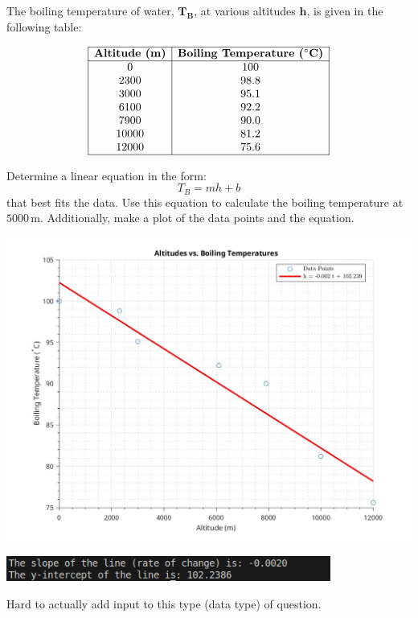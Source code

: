 \documentclass[a4paper, 12pt]{report}
\def\ni{green!60!black!40!white}
\def\link{blue!50!black}
\begin{document}
\begin{tcolorbox}[title={\color{black}\section{Q1}}, colback=white, colframe=\ni, boxrule=1mm, width=1\textwidth]
    The boiling temperature of water, \(\mathbf{T_B}\), at various altitudes \(\mathbf{h}\), is given in the following table:
    
    \[
    \begin{array}{|c|c|}
        \hline
        \textbf{Altitude (m)} & \textbf{Boiling Temperature (\(^\circ\text{C}\))} \\ \hline
        0 & 100 \\ 
        2300 & 98.8 \\ 
        3000 & 95.1 \\ 
        6100 & 92.2 \\ 
        7900 & 90.0 \\ 
        10000 & 81.2 \\ 
        12000 & 75.6 \\ \hline
    \end{array}
    \]
    
    Determine a linear equation in the form:
    \[
    T_B = mh + b
    \]
    that best fits the data. Use this equation to calculate the boiling temperature at \(5000 \, \text{m}\). Additionally, make a plot of the data points and the equation.
\end{tcolorbox}


\includegraphics[width=1\textwidth]{main/graphs_images/altitudes_vs_boiling_temperatures.jpeg}
\begin{center}
    \includegraphics[width=0.8\textwidth]{main/graphs_images/1screen.png}
\end{center}
Hard to actually add input to this type (data type) of question.
\end{document}
